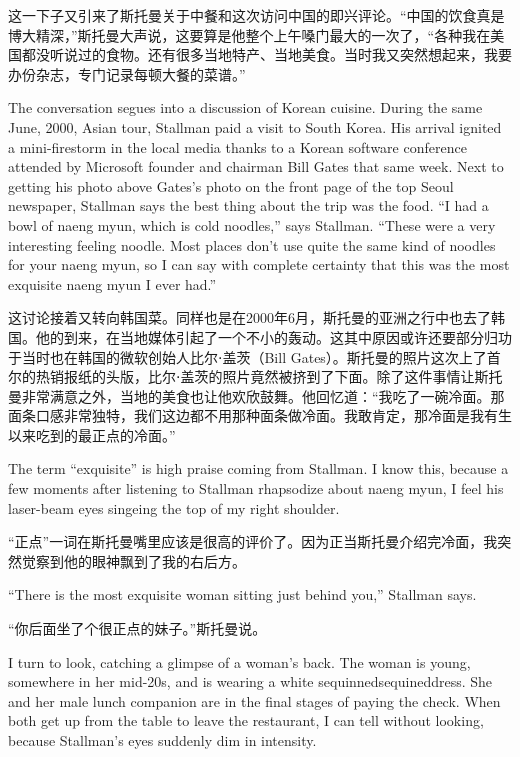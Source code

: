\ifdefined\chs
这一下子又引来了斯托曼关于中餐和这次访问中国的即兴评论。``中国的饮食真是博大精深，''斯托曼大声说，这要算是他整个上午嗓门最大的一次了，``各种我在美国都没听说过的食物。还有很多当地特产、当地美食。当时我又突然想起来，我要办份杂志，专门记录每顿大餐的菜谱。''
\fi

\ifdefined\eng
The conversation segues into a discussion of Korean cuisine. During the same June, 2000, Asian tour, Stallman paid a visit to South Korea. His arrival ignited a mini-firestorm in the local media thanks to a Korean software conference attended by Microsoft founder and chairman Bill Gates that same week. Next to getting his photo above Gates's photo on the front page of the top Seoul newspaper, Stallman says the best thing about the trip was the food. ``I had a bowl of naeng myun, which is cold noodles,'' says Stallman. ``These were a very interesting feeling noodle. Most places don't use quite the same kind of noodles for your naeng myun, so I can say with complete certainty that this was the most exquisite naeng myun I ever had.''
\fi

\ifdefined\chs
这讨论接着又转向韩国菜。同样也是在2000年6月，斯托曼的亚洲之行中也去了韩国。他的到来，在当地媒体引起了一个不小的轰动。这其中原因或许还要部分归功于当时也在韩国的微软创始人比尔⋅盖茨（Bill Gates）。斯托曼的照片这次上了首尔的热销报纸的头版，比尔⋅盖茨的照片竟然被挤到了下面。除了这件事情让斯托曼非常满意之外，当地的美食也让他欢欣鼓舞。他回忆道：``我吃了一碗冷面。那面条口感非常独特，我们这边都不用那种面条做冷面。我敢肯定，那冷面是我有生以来吃到的最正点的冷面。''
\fi

\ifdefined\eng
The term ``exquisite'' is high praise coming from Stallman. I know this, because a few moments after listening to Stallman rhapsodize about naeng myun, I feel his laser-beam eyes singeing the top of my right shoulder.
\fi

\ifdefined\chs
``正点''一词在斯托曼嘴里应该是很高的评价了。因为正当斯托曼介绍完冷面，我突然觉察到他的眼神飘到了我的右后方。
\fi

\ifdefined\eng
``There is the most exquisite woman sitting just behind you,'' Stallman says.
\fi

\ifdefined\chs
``你后面坐了个很正点的妹子。''斯托曼说。
\fi

\ifdefined\eng
I turn to look, catching a glimpse of a woman's back. The woman is young, somewhere in her mid-20s, and is wearing a white \ifdefined\vone sequinned\fi\ifdefined\vtwo sequined\fi dress. She and her male lunch companion are in the final stages of paying the check. When both get up from the table to leave the restaurant, I can tell without looking, because Stallman's eyes suddenly dim in intensity.
\fi

